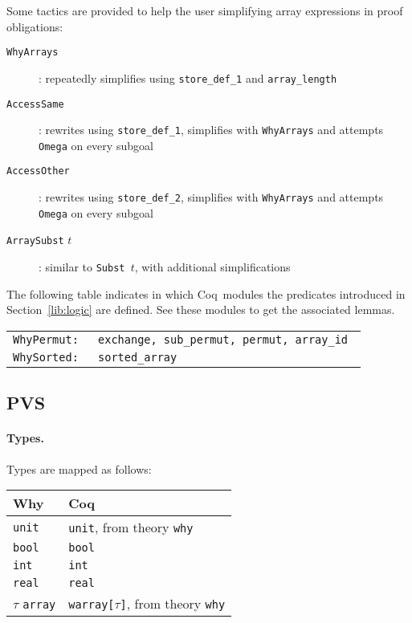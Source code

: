 \documentclass[a4paper,12pt]{report}
\makeatletter
\newcommand{\coq}{\textsf{Coq}\index{Coq@\textsf{Coq}}}
\newcommand{\why}{\textsf{Why}}
\makeatother
\begin{document}
Some tactics are provided to help the user simplifying array expressions
in proof obligations:
\begin{description}
\item[\texttt{WhyArrays}] : repeatedly simplifies using
  \texttt{store\_def\_1} and \texttt{array\_length}
\item[\texttt{AccessSame}] : rewrites using \texttt{store\_def\_1},
  simplifies with \texttt{WhyArrays} and attempts \texttt{Omega} on
  every subgoal
\item[\texttt{AccessOther}] : rewrites using \texttt{store\_def\_2},
  simplifies with \texttt{WhyArrays} and attempts \texttt{Omega} on
  every subgoal
\item[\texttt{ArraySubst} $t$] : similar to \texttt{Subst $t$}, with
  additional simplifications
\end{description}

The following table indicates in which \coq\ modules the predicates
introduced in Section~\ref{lib:logic} are defined. See these modules
to get the associated lemmas.
\begin{center}
  \begin{tabular}{rl}
    \tt WhyPermut: & \tt exchange, sub\_permut, permut, array\_id \\
    \tt WhySorted: & \tt sorted\_array
  \end{tabular}
\end{center}


\subsection{PVS}
\label{lib:pvs}

\paragraph{Types.} 
Types are mapped as follows:
\begin{center}
  \begin{tabular}{|l|l|}
    \hline
    \why & \coq \\
    \hline
    \texttt{unit} & \texttt{unit}, from theory \texttt{why} \\
    \hline
    \texttt{bool} & \texttt{bool} \\
    \hline
    \texttt{int} & \texttt{int} \\
    \hline
    \texttt{real} & \texttt{real} \\
    \hline
    $\tau$ \texttt{array} & \texttt{warray[$\tau$]},
                            from theory \texttt{why} \\
    \hline
  \end{tabular}
\end{center}
\end{document}

